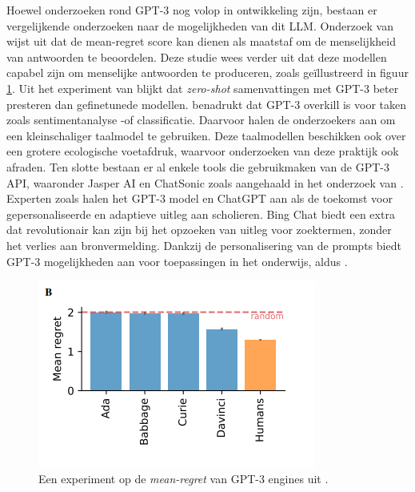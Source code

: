 Hoewel onderzoeken rond GPT-3 nog volop in ontwikkeling zijn, bestaan er vergelijkende onderzoeken naar de mogelijkheden van dit LLM. Onderzoek van \textcite{Binz2023} wijst uit dat de mean-regret score kan dienen als maatstaf om de menselijkheid van antwoorden te beoordelen. Deze studie wees verder uit dat deze modellen capabel zijn om menselijke antwoorden te produceren, zoals geïllustreerd in figuur \ref{img:mean-regret-chatgpt}. Uit het experiment van \textcite{Goyal2022} blijkt dat \textit{zero-shot} samenvattingen met GPT-3 beter presteren dan gefinetunede modellen. \autocite{Li2022} benadrukt dat GPT-3 overkill is voor taken zoals sentimentanalyse -of classificatie. Daarvoor halen de onderzoekers aan om een kleinschaliger taalmodel te gebruiken. Deze taalmodellen beschikken ook over een grotere ecologische voetafdruk, waarvoor onderzoeken van \textcite{Strubell2019, Simon2021} deze praktijk ook afraden. Ten slotte bestaan er al enkele tools die gebruikmaken van de GPT-3 API, waaronder Jasper AI en ChatSonic zoals aangehaald in het onderzoek van \textcite{Mottesi2023}. Experten zoals \textcite{Roose2023, Garg2022} halen het GPT-3 model en ChatGPT aan als de toekomst voor gepersonaliseerde en adaptieve uitleg aan scholieren. Bing Chat biedt een extra dat revolutionair kan zijn bij het opzoeken van uitleg voor zoektermen, zonder het verlies aan bronvermelding. Dankzij de personalisering van de prompts biedt GPT-3 mogelijkheden aan voor toepassingen in het onderwijs, aldus \textcite{Roose2023, Garg2022}.

\begin{figure}[H]
	\begin{center}
		\includegraphics[width=\linewidth]{img/chatgpt-engines-mean-regret.png}
		\caption{Een experiment op de \textit{mean-regret} van GPT-3 engines uit \textcite{Binz2023}.}
		\label{img:mean-regret-chatgpt}
	\end{center}
\end{figure}

